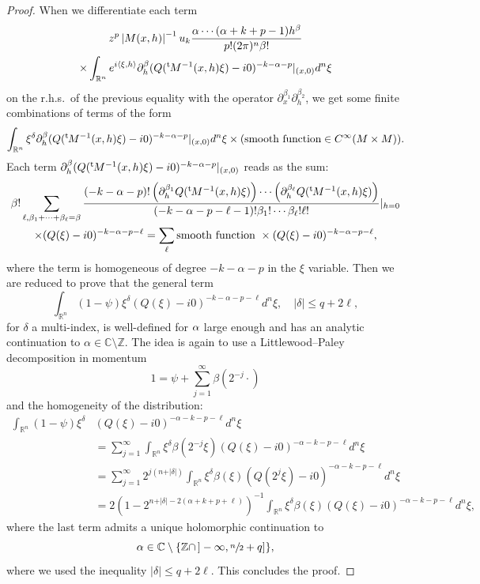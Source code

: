 \documentclass[10pt]{amsart}
\theoremstyle{definition}
\let\cv\alpha
\let\Re\relax
\DeclareMathOperator{\Re}{Re}
\newcommand{\module}[1]{\left|#1\right|}
\renewcommand{\t}{{{}^{\mathrm{t}\mkern-2mu}}}
\begin{document}
\begin{proof}
When we differentiate each term
\begin{multline*}
z^p \module{M(x,h)}^{-1} u_k \frac{\cv\cdots(\cv+k+p-1)h^\beta}{p!(2\pi)^n\beta!}\\
\times\int_{\mathbb{R}^n} e^{i\left\langle\xi,h \right\rangle}
\partial_h^\beta(Q(\t M^{-1}(x,h)\xi)-i0)^{-k-\cv-p}|_{(x,0)} d^n\xi
\end{multline*}
on the r.h.s.~of the previous equality with the operator $\partial_x^{\beta_1}\partial_h^{\beta_2}$,
we get some finite combinations of terms of the form
\[
\int_{\mathbb{R}^n} \xi^\delta
\partial_h^\beta(Q(\t M^{-1}(x,h)\xi)-i0)^{-k-\cv-p}|_{(x,0)} d^n\xi
\times (\text{smooth function}\in C^\infty(M\times M)).
\]
Each term $\partial_h^\beta(Q(\t M^{-1}(x,h)\xi)-i0)^{-k-\cv-p}|_{(x,0)} $ reads as the sum:
\begin{multline*}
\beta! \sum_{\ell,\beta_1+\cdots+\beta_\ell=\beta} \frac{(-k-\cv-p)! \left(\partial_h^{\beta_1}Q(\t M^{-1}(x,h)\xi)\right)\cdots
\left(\partial_h^{\beta_\ell}Q(\t M^{-1}(x,h)\xi)\right) }{(-k-\cv-p-\ell-1)!\beta_1!\cdots\beta_\ell!\ell!} |_{h=0}
\\
\times (Q(\xi)-i0)^{-k-\cv-p-\ell}=\sum_\ell \text{smooth function }\times (Q(\xi)-i0)^{-k-\cv-p-\ell},
\end{multline*}
where the term is homogeneous of degree $-k-\cv-p$ in the $\xi$ variable.
Then we are reduced to prove that
the general term
\[
\int_{\mathbb{R}^n}(1-\psi)\xi^\delta (Q(\xi)-i0)^{-k-\cv-p-\ell}d^n\xi , \quad \vert\delta\vert\leqslant q+2\ell,
\]
for $\delta$ a multi-index,
is well-defined for $\Re \cv$ large enough and
has an {analytic continuation} to $\cv\in \mathbb{C}\setminus \mathbb{Z}$. The idea is again to use a Littlewood--Paley decomposition in momentum
\[
1=\psi+\sum_{j=1}^\infty \beta(2^{-j}\cdot)
\]
and the homogeneity of the distribution:
\[
\begin{aligned}
\int_{\mathbb{R}^n}(1-\psi)\xi^\delta& (Q(\xi)-i0)^{-\cv-k-p-\ell} d^n\xi \\
&=\sum_{j=1}^\infty \int_{\mathbb{R}^n}\xi^\delta \beta(2^{-j}\xi) (Q(\xi)-i0)^{-\cv-k-p-\ell} d^n\xi\\
&=\sum_{j=1}^\infty 2^{j(n+\vert\delta\vert)}\int_{\mathbb{R}^n}\xi^\delta \beta(\xi) (Q(2^j\xi)-i0)^{-\cv-k-p-\ell} d^n\xi\\
&=2(1-2^{n+\vert\delta\vert-2(\cv+k+p+\ell)})^{-1}\int_{\mathbb{R}^n}\xi^\delta \beta(\xi) (Q(\xi)-i0)^{-\cv-k-p-\ell} d^n\xi,
\end{aligned}
\]
where the last term admits a unique holomorphic continuation to
\[
\cv\in \mathbb{C}\setminus \{\mathbb{Z}\cap \,]-\infty, \sfrac{n}{2} +q] \},
\]
where we used the inequality $\vert\delta\vert\leqslant q+2\ell$.
This concludes the proof.
\end{proof}
\end{document}
